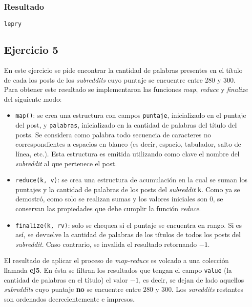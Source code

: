 \documentclass[a4paper]{article}
\begin{document}
\subsubsection{Resultado}
\begin{verbatim}
lepry
\end{verbatim}

\subsection{Ejercicio 5}
En este ejercicio se pide encontrar la cantidad de palabras presentes en el
título de cada los posts de los \textit{subreddits} cuyo puntaje se encuentre
entre 280 y 300. Para obtener este resultado se implementaron las funciones
\textit{map}, \textit{reduce} y \textit{finalize} del siguiente modo:
\begin{itemize}
  \item \verb|map()|: se crea una estructura con campos \verb|puntaje|,
  inicializado en el puntaje del post, y \verb|palabras|, inicializado en la
  cantidad de palabras del título del posts. Se considera como palabra todo
  secuencia de caracteres no correspondientes a espacios en blanco (es decir,
  espacio, tabulador, salto de línea, etc.). Esta estructura es emitida
  utilizando como clave el nombre del \textit{subreddit} al que pertenece el
  post.
  \item \verb|reduce(k, v)|: se crea una estructura de acumulación en la cual
  se suman los puntajes y la cantidad de palabras de los posts del
  \textit{subreddit} \verb|k|. Como ya se demostró, como solo se realizan sumas
  y los valores iniciales son $0$, se conservan las propiedades que debe
  cumplir la función \textit{reduce}.
  \item \verb|finalize(k, rv)|: solo se chequea si el puntaje se encuentra en
  rango. Si es así, se devuelve la cantidad de palabras de los títulos de todos
  los posts del \textit{subreddit}. Caso contrario, se invalida el resultado
  retornando $-1$.
\end{itemize}

El resultado de aplicar el proceso de \textit{map-reduce} es volcado a una
colección llamada \textbf{ej5}. En ésta se filtran los resultados que tengan el
campo \verb|value| (la cantidad de palabras en el título) el valor $-1$, es
decir, se dejan de lado aquellos \textit{subreddits} cuyo puntaje \textbf{no}
se encuentre entre 280 y 300. Los \textit{sureddits} restantes son ordenados
decrecientemente e impresos.
\end{document}
